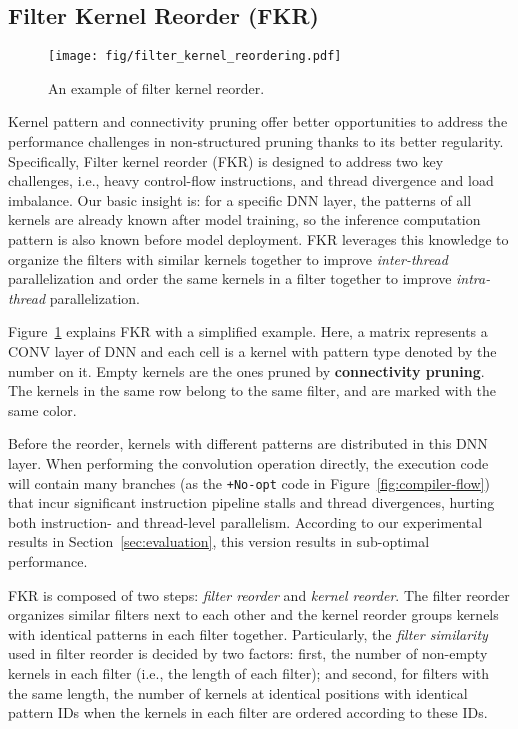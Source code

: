 \documentclass[sigplan,screen]{acmart}
\begin{document}
\subsection{Filter Kernel Reorder (FKR)}\label{sec:reorder}

\begin{figure}\centering
    \texttt{[image: fig/filter\_kernel\_reordering.pdf]}
\caption{An example of filter kernel reorder.}
    \label{fig:kernel-reorder}
\end{figure}



Kernel pattern and connectivity pruning offer better opportunities to address the performance challenges in non-structured pruning thanks to its better regularity.
Specifically, 
Filter kernel reorder (FKR) is designed to address two key challenges, i.e., heavy control-flow instructions, and thread divergence and load imbalance. Our basic insight is: for a specific DNN layer, the patterns of all kernels are already known after model training, so the inference computation pattern is also known before model deployment. FKR leverages this knowledge to organize the filters with similar kernels together to improve {\em inter-thread} parallelization and order the same kernels in a filter together to improve {\em intra-thread} parallelization.   

Figure~\ref{fig:kernel-reorder} explains FKR with a simplified example. Here, a matrix represents a CONV layer of DNN and each cell is a kernel with pattern type denoted by the number on it. Empty kernels are the ones pruned by {\bf connectivity pruning}. The kernels in the same row belong to the same filter, and are marked with the same color.

Before the reorder, kernels with different patterns are distributed in this DNN layer. When performing the convolution operation directly, the execution code will contain many branches (as the {\tt +No-opt} code in Figure~\ref{fig:compiler-flow})
that incur significant instruction pipeline stalls and thread divergences, hurting both instruction- and thread-level parallelism. According to our experimental results in Section~\ref{sec:evaluation}, this version results in sub-optimal performance.

FKR is composed of two steps: {\em filter reorder} and {\em kernel reorder}. The filter reorder organizes similar filters next to each other and the kernel reorder groups kernels with identical patterns in each filter together. Particularly, the {\em filter similarity} used in filter reorder is decided by two factors: first, the number of non-empty kernels in each filter (i.e., the length of each filter); and second, for filters with the same length, the number of kernels at identical positions with identical pattern IDs when the kernels in each filter are ordered according to these IDs.   
\end{document}

